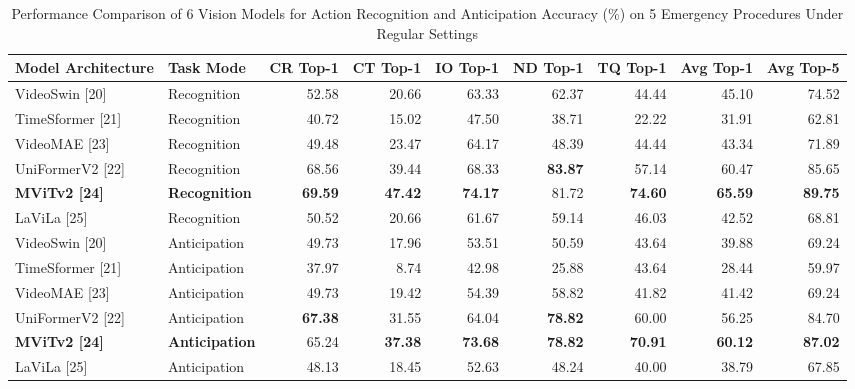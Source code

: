 \documentclass[12pt,a4paper]{report}
\begin{document}
\begin{table}[htbp]
\centering
\caption{Performance Comparison of 6 Vision Models for Action Recognition and Anticipation Accuracy (\%) on 5 Emergency Procedures Under Regular Settings}
\label{tab:action_benchmark}
\scriptsize
\begin{tabularx}{\textwidth}{@{}l l r r r r r r r@{}}
\toprule
\textbf{Model Architecture} & \textbf{Task Mode} & \textbf{CR Top-1} & \textbf{CT Top-1} & \textbf{IO Top-1} & \textbf{ND Top-1} & \textbf{TQ Top-1} & \textbf{Avg Top-1} & \textbf{Avg Top-5} \\
\midrule
VideoSwin [20]    & Recognition  & 52.58 & 20.66 & 63.33 & 62.37 & 44.44 & 45.10 & 74.52 \\
TimeSformer [21]  & Recognition  & 40.72 & 15.02 & 47.50 & 38.71 & 22.22 & 31.91 & 62.81 \\
VideoMAE [23]     & Recognition  & 49.48 & 23.47 & 64.17 & 48.39 & 44.44 & 43.34 & 71.89 \\
UniFormerV2 [22]  & Recognition  & 68.56 & 39.44 & 68.33 & \textbf{83.87} & 57.14 & 60.47 & 85.65 \\
\textbf{MViTv2 [24]} & \textbf{Recognition} & \textbf{69.59} & \textbf{47.42} & \textbf{74.17} & 81.72 & \textbf{74.60} & \textbf{65.59} & \textbf{89.75} \\
LaViLa [25]       & Recognition  & 50.52 & 20.66 & 61.67 & 59.14 & 46.03 & 42.52 & 68.81 \\
\midrule
VideoSwin [20]    & Anticipation & 49.73 & 17.96 & 53.51 & 50.59 & 43.64 & 39.88 & 69.24 \\
TimeSformer [21]  & Anticipation & 37.97 & 8.74  & 42.98 & 25.88 & 43.64 & 28.44 & 59.97 \\
VideoMAE [23]     & Anticipation & 49.73 & 19.42 & 54.39 & 58.82 & 41.82 & 41.42 & 69.24 \\
UniFormerV2 [22]  & Anticipation & \textbf{67.38} & 31.55 & 64.04 & \textbf{78.82} & 60.00 & 56.25 & 84.70 \\
\textbf{MViTv2 [24]} & \textbf{Anticipation} & 65.24 & \textbf{37.38} & \textbf{73.68} & \textbf{78.82} & \textbf{70.91} & \textbf{60.12} & \textbf{87.02} \\
LaViLa [25]       & Anticipation & 48.13 & 18.45 & 52.63 & 48.24 & 40.00 & 38.79 & 67.85 \\
\bottomrule
\end{tabularx}
\end{table}
\end{document}

